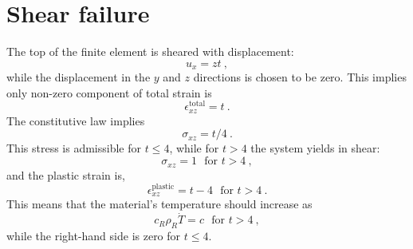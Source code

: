 \documentclass[]{scrreprt}
\begin{document}
\section{Shear failure}

The top of the finite element is sheared with displacement:
\begin{equation}
u_{x} = zt \ ,
\end{equation}
while the displacement in the $y$ and $z$ directions is chosen to be
zero.  This implies only non-zero component of total strain is
\begin{equation}
\epsilon^{\mathrm{total}}_{xz} = t \ .
\end{equation}
The constitutive law implies
\begin{equation}
\sigma_{xz} = t/4 \ .
\end{equation}
This stress is admissible for $t\leq 4$, while for $t>4$ the system
yields in shear:
\begin{equation}
\sigma_{xz} = 1 \ \ \ \mbox{for } t>4 \ ,
\end{equation}
and the plastic strain is,
\begin{equation}
\epsilon^{\mathrm{plastic}}_{xz} = t - 4 \ \ \ \mbox{for } t>4 \ .
\end{equation}
This means that the material's temperature should increase as
\begin{equation}
c_{R}\rho_{R}\dot{T} = c \ \ \ \mbox{for } t>4 \ ,
\end{equation}
while the right-hand side is zero for $t\leq 4$.
\end{document}
